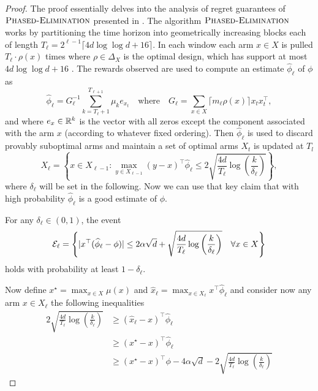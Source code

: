 \begin{proof}
    The proof essentially delves into the analysis of regret guarantees of $\textsc{Phased-Elimination}$ presented in \citet{lattimore2020learning}. The algorithm $\textsc{Phased-Elimination}$ works by partitioning the time horizon into geometrically increasing blocks each of length $T_\ell=2^{\ell-1}\lceil 4d\log\log d+16\rceil$. In each window each arm $x\in X$ is pulled $T_\ell\cdot\rho(x)$ times where $\rho\in\Delta_X$ is the optimal design, which has support at most $4d \log \log d + 16$ \citep{todd2016minimum}. The rewards observed are used to compute an estimate $\widehat \phi_\ell$ of $\phi$ as
    \[
    \widehat \phi_\ell=G_\ell^{-1}\sum_{k=T_{\ell}+1}^{T_{\ell+1}} \mu_k e_{x_t}\quad\text{where}\quad G_\ell=\sum_{x\in X} \lceil m_\ell\rho(x)\rceil x_tx_t^\top,
    \]
    and where $e_x\in\mathbb{R}^{k}$ is the vector with all zeros except the component associated with the arm $x$ (according to whatever fixed ordering).
    Then $\widehat \phi_\ell$ is used to discard provably suboptimal arms and maintain a set of optimal arms $X_t$ is updated at $T_l$
    \[
    X_{\ell}=\left\{x\in X_{{\ell-1}}:\max_{y\in X_{{\ell-1}}} (y-x)^\top \widehat\phi_\ell\le2\sqrt{\frac{4d}{T_\ell}\log\left(\frac{k}{\delta_\ell}\right)}\right\},
    \]
    where $\delta_\ell$ will be set in the following.
    Now we can use that key claim that with high probability $\widehat \phi_\ell$ is a good estimate of $\phi$.
    \begin{claim}\label{claim:estimation}
    For any $\delta_\ell\in(0,1)$, the event 
    \[
    \mathcal{E}_\ell=\left\{|x^\top(\widehat \phi_\ell-\phi)|\le 2\alpha\sqrt{d}+\sqrt{\frac{4d}{T_\ell}\log\left(\frac{k}{\delta_\ell}\right)}\quad\forall x\in X\right\}
    \]
    holds with probability at least $1-\delta_\ell$.
    \end{claim}
    Now define $x^\star=\max_{x\in X}\mu(x)$ and $\widehat x_\ell=\max_{x\in X_\ell}x^\top\widehat \phi_\ell$ and consider now any arm $x\in X_\ell$ the following inequalities
    \begin{align}
        2\sqrt{\frac{4d}{T_\ell}\log\left(\frac{k}{\delta_\ell}\right)}&\ge (\widehat x_\ell-x)^\top \widehat \phi_\ell\tag{Since $x\in X_\ell$}\\
        &\ge (x^\star-x)^\top \widehat \phi_\ell\tag{Definition of $\widehat x_\ell$}\\
        &\ge (x^\star-x)^\top \phi - 4\alpha\sqrt{d}-2\sqrt{\frac{4d}{T_\ell}\log\left(\frac{k}{\delta_\ell}\right)}\tag{Under event $\Ecal_\ell$}
    \end{align}


\end{proof}
